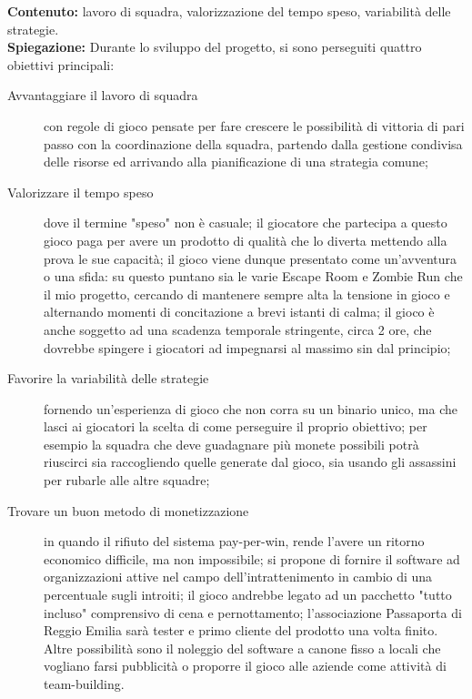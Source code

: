 \documentclass[
	twoside]				%
	{toptesi}				%
\begin{document}
	\textbf{Contenuto:} lavoro di squadra, valorizzazione del tempo speso, variabilità delle strategie. \\
	
	\textbf{Spiegazione:} Durante lo sviluppo del progetto, si sono perseguiti quattro obiettivi principali:
	\begin{description}
		\item[Avvantaggiare il lavoro di squadra] con regole di gioco pensate per fare crescere le possibilità di vittoria di pari passo con la coordinazione della squadra, partendo dalla gestione condivisa delle risorse ed arrivando alla pianificazione di una strategia comune;
		
		\item[Valorizzare il tempo speso] dove il termine "speso" non è casuale; il giocatore che partecipa a questo gioco paga per avere un prodotto di qualità che lo diverta mettendo alla prova le sue capacità; il gioco viene dunque presentato come un'avventura o una sfida: su questo puntano sia le varie Escape Room e Zombie Run che il mio progetto, cercando di mantenere sempre alta la tensione in gioco e alternando momenti di concitazione a brevi istanti di calma; il gioco è anche soggetto ad una scadenza temporale stringente, circa 2 ore, che dovrebbe spingere i giocatori ad impegnarsi al massimo sin dal principio;
		
		\item[Favorire la variabilità delle strategie] fornendo un'esperienza di gioco che non corra su un binario unico, ma che lasci ai giocatori la scelta di come perseguire il proprio obiettivo; per esempio la squadra che deve guadagnare più monete possibili potrà riuscirci sia raccogliendo quelle generate dal gioco, sia usando gli assassini per rubarle alle altre squadre;
		
		\item[Trovare un buon metodo di monetizzazione] in quando il rifiuto del sistema pay-per-win, rende l'avere un ritorno economico difficile, ma non impossibile; si propone di fornire il software ad organizzazioni attive nel campo dell'intrattenimento in cambio di una percentuale sugli introiti; il gioco andrebbe legato ad un pacchetto "tutto incluso" comprensivo di cena e pernottamento; l'associazione Passaporta di Reggio Emilia sarà tester e primo cliente del prodotto una volta finito.
		Altre possibilità sono il noleggio del software a canone fisso a locali che vogliano farsi pubblicità o proporre il gioco alle aziende come attività di team-building.
	\end{description}
	
\end{document}
